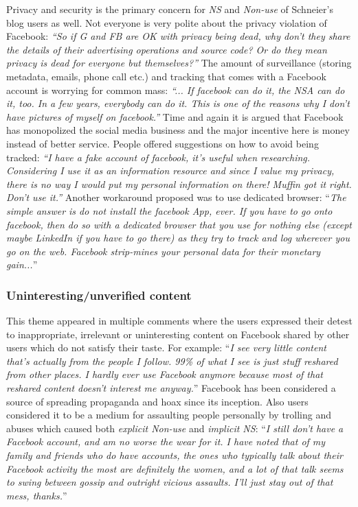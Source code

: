    Privacy and security is the primary concern for \emph{NS} and \emph{Non-use} of Schneier's blog users as well. Not everyone is very polite about the privacy violation of Facebook: \textit{``So if G and FB are OK with privacy being dead, why don't they share the details of their advertising operations and source code? Or do they mean privacy is dead for everyone but themselves?''} The amount of surveillance (storing metadata, emails, phone call etc.) and tracking that comes with a Facebook account is worrying for common mass: \textit{``... If facebook can do it, the NSA can do it, too. In a few years, everybody can do it. This is one of the reasons why I don't have pictures of myself on facebook.''} Time and again it is argued that Facebook has monopolized the social media business and the major incentive here is money instead of better service. People offered suggestions on how to avoid being tracked: \textit{``I have a fake account of facebook, it's useful when researching. Considering I use it as an information resource and since I value my privacy, there is no way I would put my personal information on there! Muffin got it right. Don't use it.''} Another workaround proposed was to use dedicated browser: ``\textit{The simple answer is do not install the facebook App, ever. If you have to go onto facebook, then do so with a dedicated browser that you use for nothing else (except maybe LinkedIn if you have to go there) as they try to track and log wherever you go on the web. Facebook strip-mines your personal data for their monetary gain...}''

    
 \subsubsection{Uninteresting/unverified content }
 This theme appeared in multiple comments where the users expressed their detest to inappropriate, irrelevant or uninteresting content on Facebook shared by other users which do not satisfy their taste. For example: ``\textit{I see very little content that's actually from the people I follow. 99\% of what I see is just stuff reshared from other places. I hardly ever use Facebook anymore because most of that reshared content doesn't interest me anyway.}'' Facebook has been considered a source of spreading propaganda and hoax since its inception. Also users considered it to be a medium for assaulting people personally by trolling and abuses which caused both \emph{explicit Non-use} and \emph{implicit NS}:
``\textit{I still don't have a Facebook account, and am no worse the wear for it. I have noted that of my family and friends who do have accounts, the ones who typically talk about their Facebook activity the most are definitely the women, and a lot of that talk seems to swing between gossip and outright vicious assaults. I'll just stay out of that mess, thanks.}''

